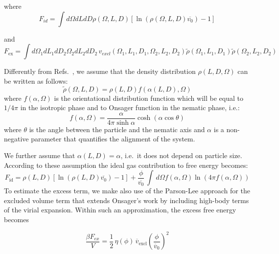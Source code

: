 \documentclass[journal=jacsat,manuscript=article]{achemso}
\begin{document}
where
\begin{equation}
  F_{id} = \int d\Omega dL dD \rho(\Omega,L,D) \left [\ln(\rho(\Omega,L,D) \overline{v_0}) - 1 \right]
\end{equation}

and 
\begin{equation}
  F_\mathrm{ex} = \int d\Omega_1 dL_1 dD_2\Omega_2 dL_2 dD_2 \, v_{excl}(\Omega_1,L_1,D_1,\Omega_2,L_2,D_2) \tilde\rho(\Omega_1,L_1,D_1) 
  \tilde\rho(\Omega_2,L_2,D_2)
\end{equation}

Differently from Refs.~\cite{Speranza2002,Wensink2003}, we assume that the density distribution
$\rho(L, D, \Omega)$ can be written as follows:
\begin{equation}
\tilde\rho(\Omega, L, D) = \rho(L,D) f(\alpha(L,D), \Omega)
\end{equation}
where $f(\alpha,\Omega)$ is the orientational distribution function which will be equal to $1/4\pi$ in the isotropic phase and 
to Onsager function in the nematic phase, i.e.:
\begin{equation}
	f(\alpha,\Omega) = \frac{\alpha}{4 \pi \sinh \alpha} \cosh(\alpha \cos \theta)
\end{equation}
where $\theta$ is the angle between the particle and the nematic axis and $\alpha$ is a non-negative parameter that quantifies the alignment of the system.

We further assume that $\alpha(L,D)=\alpha$, i.e.~it does not depend on particle size.
According to these assumption the ideal gas contribution to free energy becomes:
\begin{equation}
  F_\mathrm{id} =  \rho(L,D) \left[\ln(\rho(L,D)\overline{v_0}) - 1\right ] + \frac{\phi}{\overline{v_0}} \, 
  \int \, d\Omega f(\alpha,\Omega) \ln(4 \pi f(\alpha,\Omega))
\end{equation}
To estimate the excess term, we make also use of the Parson-Lee approach for the excluded volume term \cite{Parson} that extends Onsager's work \cite{onsager1949effects} by including high-body terms of the virial expansion. Within such an approximation, the excess free energy becomes 

\begin{equation}
  \frac{\beta F_{ex}}{V} = \frac{1}{2} \, \eta(\phi) \, \overline{v}_\mathrm{excl}  \left( \frac{\phi}{\overline{v}_0} \right)^2
\end{equation}

\end{document}
